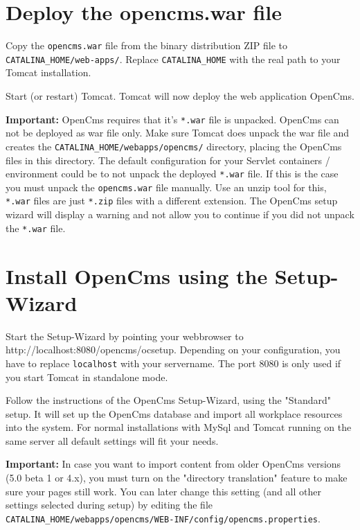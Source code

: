 \section{Deploy the opencms.war file}
Copy the \texttt{opencms.war} file from the binary distribution ZIP file to
\texttt{CATALINA\_HOME/web-apps/}. Replace
\texttt{CATALINA\_HOME} with the real path to your Tomcat
installation.

Start (or restart) Tomcat. Tomcat will now deploy the web application
OpenCms.

\textbf{Important:} OpenCms requires that it's \texttt{*.war} file is unpacked. 
OpenCms can not be deployed as war file only. 
Make sure Tomcat does unpack the war file and creates the \texttt{CATALINA\_HOME/webapps/opencms/} directory, 
placing the OpenCms files in this directory. 
The default configuration for your Servlet containers / environment could be to not unpack the deployed \texttt{*.war} file. 
If this is the case you must unpack the \texttt{opencms.war} file manually. 
Use an unzip tool for this, \texttt{*.war} files are just \texttt{*.zip} files with a different extension. 
The OpenCms setup wizard will display a warning and not allow you to continue 
if you did not unpack the  \texttt{*.war} file.

\section{Install OpenCms using the Setup-Wizard}
Start the Setup-Wizard by pointing your webbrowser to\\
    {http://localhost:8080/opencms/ocsetup}.
Depending on your configuration, you have to replace \texttt{localhost} with your servername. 
The port 8080 is only used if you start Tomcat in standalone mode.

Follow the instructions of the OpenCms Setup-Wizard, using the "Standard" setup. It will set
up the OpenCms database and import all workplace resources into
the system. For normal installations with MySql and Tomcat running
on the same server all default settings will fit your needs.

\textbf{Important:} In case you want to import content from older OpenCms versions (5.0 beta 1 or 4.x), 
you must turn on the "directory translation" feature to make sure your pages still work. 
You can later change this setting (and all other settings selected during setup) 
by editing the file \texttt{CATALINA\_HOME/webapps/opencms/WEB-INF/config/opencms.properties}.


